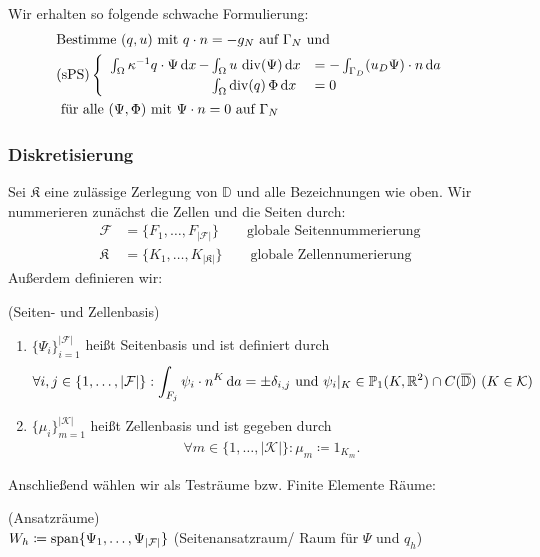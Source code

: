 Wir erhalten so folgende schwache Formulierung:
\begin{align*}
&\text{Bestimme } (q,u) \text{ mit } q\cdot n = -g_N \text{ auf } \Gamma_N \text{ und}\\
&\text{(sPS)}\begin{cases}
\begin{array}{llll}
\int_{\Omega} \kappa^{-1} q \cdot \Psi \, \mathrm{d} x \, - \mkern-15mu &\int_{\Omega} u \, \operatorname{div}(\Psi) \, \mathrm{d} x &= - \int_{\Gamma_D} (u_D \Psi) \cdot n \, \mathrm{d} a\\
&\int_{\Omega} \operatorname{div}(q) \, \Phi \, \mathrm{d} x &= 0
\end{array}
\end{cases}	\\
&\text{ für alle } (\Psi, \Phi) \text{ mit } \Psi \cdot n = 0 \text{ auf } \Gamma_N 
\end{align*}

\subsubsection{Diskretisierung}
Sei $ \mathfrak{K}  $ eine zulässige Zerlegung von $ \mathbb{D} $ und alle Bezeichnungen wie oben.
Wir nummerieren zunächst die Zellen und die Seiten durch:
\begin{align*}
	\mathcal{F} &= \{ F_1,\dots,F_{|\mathcal{F}|}\} \qquad \text{globale Seitennummerierung} \\
	\mathfrak{K} &=  \{ K_1,\dots,K_{|\mathfrak{K}|}\} \qquad \text{globale Zellennumerierung}
\end{align*}
Außerdem definieren wir:
\begin{Definition}(Seiten- und Zellenbasis) \\
	\begin{enumerate}[label=(\alph*)]
		\item $ \{ \Psi_i \}_{i=1}^{|\mathcal{F}|} $ heißt Seitenbasis und ist definiert durch
			\begin{align*}
					\forall i,j \in \{1, \dots , |\mathcal{F}| \} : \int_{F_j} \psi_i \cdot n^K \, \mathrm{d} a = \pm \delta_{i,j} \text{ und }  \psi_i|_K \in \mathbb{P}_1(K,\mathbb{R}^2) \cap C(\overline{\mathbb{D}}) \ (K \in \mathcal{K}) 
			\end{align*} 
		\item $ \{ \mu_i \}_{m=1}^{|\mathcal{K}|} $ heißt Zellenbasis und ist gegeben durch
			\begin{align*}
				\forall m \in \{1, \dots , |\mathcal{K}| \} : \mu_m \coloneqq  1_{K_m}.
			\end{align*}
	\end{enumerate}
\end{Definition} 

Anschließend wählen wir als Testräume bzw. Finite Elemente Räume:
\begin{Definition}(Ansatzräume)\\
	$ W_h \coloneqq \operatorname{span} \{ \Psi_1,\dots,\Psi_{|\mathcal{F}|}\}$ (Seitenansatzraum/ Raum für $ \Psi $ und $ q_h $)
	
\end{Definition}





